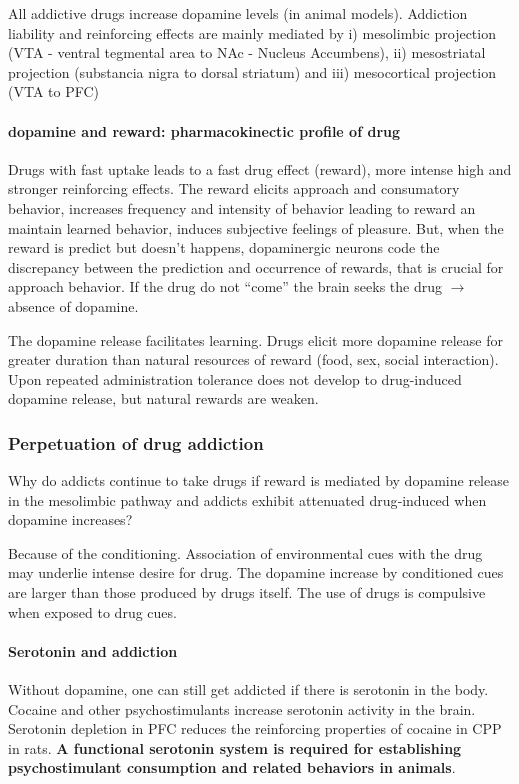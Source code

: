 \documentclass[12pt,article,oneside,a4paper]{memoir}
\begin{document}
All addictive drugs increase dopamine levels (in animal models). Addiction liability and reinforcing effects are mainly mediated by i) mesolimbic projection (VTA - ventral tegmental area to NAc - Nucleus Accumbens), ii) mesostriatal projection (substancia nigra to dorsal striatum) and iii) mesocortical projection (VTA to PFC)

\paragraph{dopamine and reward: pharmacokinectic profile of drug}
Drugs with fast uptake leads to a fast drug effect (reward), more intense high and stronger reinforcing effects.
The reward elicits approach and consumatory behavior, increases frequency and intensity of behavior leading to reward an maintain learned behavior, induces subjective feelings of pleasure. But, when the reward is predict but doesn't happens, dopaminergic neurons code the discrepancy between the prediction and occurrence of rewards, that is crucial for approach behavior. If the drug do not ``come'' the brain seeks the drug $\rightarrow$ absence of dopamine.

The dopamine release facilitates learning. Drugs elicit more dopamine release for greater duration than natural resources of reward (food, sex, social interaction). Upon repeated administration tolerance does not develop to drug-induced dopamine release, but natural rewards are weaken.

\subsubsection{Perpetuation of drug addiction}
Why do addicts continue to take drugs if reward is mediated by dopamine release in the mesolimbic pathway and addicts exhibit attenuated drug‐induced when dopamine increases?

Because of the conditioning. Association of environmental cues with the drug may underlie intense desire for drug. The dopamine increase by conditioned cues are larger than those produced by drugs itself. The use of drugs is compulsive when exposed to drug cues.

\paragraph{Serotonin and addiction}
Without dopamine, one can still get addicted if there is serotonin in the body. Cocaine and other psychostimulants increase serotonin activity in the brain. Serotonin depletion in PFC reduces the reinforcing properties of cocaine in CPP in rats. \textbf{A functional serotonin system is required for establishing psychostimulant consumption and related behaviors in animals}.
\end{document}
